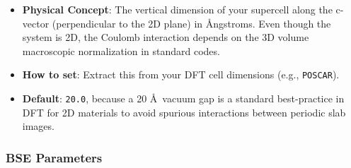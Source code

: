 \documentclass[11pt, a4paper]{article}
\begin{document}
\begin{itemize}
\begin{itemize}
        \item \textbf{Physical Concept}: The vertical dimension of your supercell along the c-vector (perpendicular to the 2D plane) in \AA ngstroms. Even though the system is 2D, the Coulomb interaction depends on the 3D volume macroscopic normalization in standard codes.
        \item \textbf{How to set}: Extract this from your DFT cell dimensions (e.g., \texttt{POSCAR}).
        \item \textbf{Default}: \texttt{20.0}, because a 20 \AA\ vacuum gap is a standard best-practice in DFT for 2D materials to avoid spurious interactions between periodic slab images.
    \end{itemize}
\end{itemize}

\subsubsection{BSE Parameters}
\end{document}
